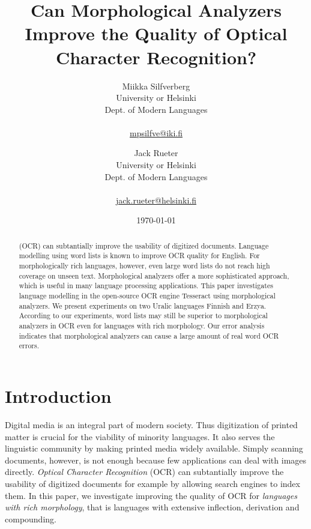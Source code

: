 \documentclass[b5paper]{article}
\begin{document}
\title{Can Morphological Analyzers Improve the Quality of Optical Character Recognition?}

\author{Miikka Silfverberg\\
University or Helsinki\\
Dept. of Modern Languages\\
\\
\url{mpsilfve@iki.fi} \and
Jack Rueter\\
University or Helsinki\\
Dept. of Modern Languages\\
\\
\url{jack.rueter@helsinki.fi} 
}

\date{\today}

\maketitle

\begin{abstract}
 (OCR) can subtantially improve
  the usability of digitized documents. Language modelling using word
  lists is known to improve OCR quality for English. For
  morphologically rich languages, however, even large word lists do not reach
  high coverage on unseen text. Morphological analyzers offer a more
  sophisticated approach, which is useful in many language processing
  applications. This paper investigates language modelling in the
  open-source OCR engine Tesseract using morphological analyzers. We
  present experiments on two Uralic languages Finnish and
  Erzya. According to our experiments, word lists may still be
  superior to morphological analyzers in OCR even for languages with
  rich morphology. Our error analysis indicates that morphological
  analyzers can cause a large amount of real word OCR errors.
\end{abstract}

\section{Introduction}

Digital media is an integral part of modern society. Thus digitization
of printed matter is crucial for the viability of minority languages. It
also serves the linguistic community by making printed media widely
available. Simply scanning documents, however, is not enough because
few applications can deal with images directly. {\it Optical Character
  Recognition} (OCR) can subtantially improve the usability of
digitized documents for example by allowing search engines to index
them. In this paper, we investigate improving the quality of OCR for
{\it languages with rich morphology}, that is languages with extensive
inflection, derivation and compounding.
\end{document}
